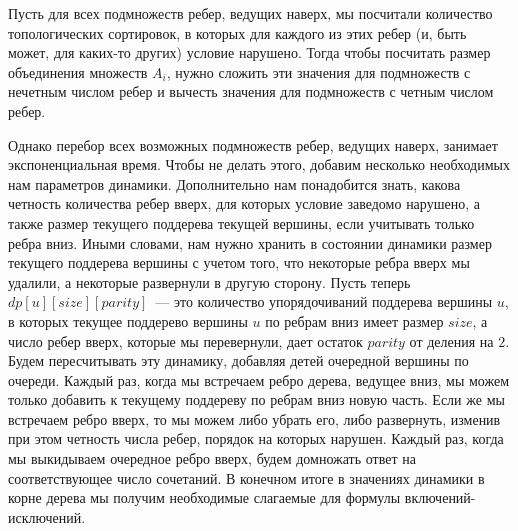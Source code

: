 Пусть для всех подмножеств ребер, ведущих наверх, мы посчитали количество топологических сортировок, в которых для каждого из этих ребер (и, быть может, для каких-то других) условие нарушено. Тогда чтобы посчитать размер объединения множеств $A_i$, нужно сложить эти значения для подмножеств с нечетным числом ребер и вычесть значения для подмножеств с четным числом ребер.

Однако перебор всех возможных подмножеств ребер, ведущих наверх, занимает экспоненциальная время. Чтобы не делать этого, добавим несколько необходимых нам параметров динамики. Дополнительно нам понадобится знать, какова четность количества ребер вверх, для которых условие заведомо нарушено, а также размер текущего поддерева текущей вершины, если учитывать только ребра вниз. Иными словами, нам нужно хранить в состоянии динамики размер текущего поддерева вершины с учетом того, что некоторые ребра вверх мы удалили, а некоторые развернули в другую сторону. Пусть теперь $dp[u][size][parity]$~--- это количество упорядочиваний поддерева вершины $u$, в которых текущее поддерево вершины $u$ по ребрам вниз имеет размер $size$, а число ребер вверх, которые мы перевернули, дает остаток $parity$ от деления на $2$. Будем пересчитывать эту динамику, добавляя детей очередной вершины по очереди. Каждый раз, когда мы встречаем ребро дерева, ведущее вниз, мы можем только добавить к текущему поддереву по ребрам вниз новую часть. Если же мы встречаем ребро вверх, то мы можем либо убрать его, либо развернуть, изменив при этом четность числа ребер, порядок на которых нарушен. Каждый раз, когда мы выкидываем очередное ребро вверх, будем домножать ответ на соответствующее число сочетаний. В конечном итоге в значениях динамики в корне дерева мы получим необходимые слагаемые для формулы включений-исключений.